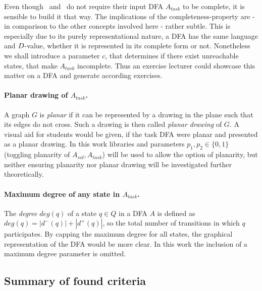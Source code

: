 Even though \CompUnr\ and \RemUnr\ do not require their input DFA $A_{task}$ to be complete, it is sensible to build it that way. The implications of the completeness-property are - in comparison to the other concepts involved here - rather subtle. This is especially due to its purely representational nature, a DFA has the same language and $D$-value, whether it is represented in its complete form or not. Nonetheless we shall introduce a parameter $c$, that determines if there exist unreachable states, that make $A_{task}$ incomplete. Thus an exercise lecturer could showcase this matter on a DFA and generate according exercises.

\paragraph*{Planar drawing of $A_{task}$.}

A graph $G$ is \emph{planar} if it can be represented by a drawing in the plane such that its edges do not cross. Such a drawing is then called \emph{planar drawing} of $G$. A visual aid for students would be given, if the task DFA were planar and presented as a planar drawing. In this work libraries and parameters $p_1, p_2 \in \{0,1\}$ (toggling planarity of $A_{sol}, A_{task}$) will be used to allow the option of planarity, but neither ensuring planarity nor planar drawing will be investigated further theoretically.

\paragraph*{Maximum degree of any state in $A_{task}$.}

The \emph{degree} $deg(q)$ of a state $q \in Q$ in a DFA $A$ is defined as $deg(q) = |d^-(q)| + |d^+(q)|$, so the total number of transitions in which $q$ participates. By capping the maximum degree for all states, the graphical representation of the DFA would be more clear. In this work the inclusion of a maximum degree parameter is omitted.


\subsection{Summary of found criteria}


